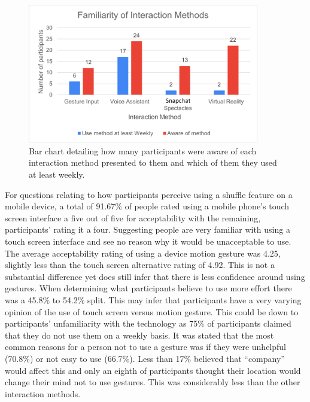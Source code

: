 \documentclass{l4proj}
\begin{document}
\begin{figure}[h!]
    \centering
    \includegraphics[width=0.9\textwidth]{images/familiarity.png}
        \caption{Bar chart detailing how many participants were aware of each interaction method presented to them and which of them they used at least weekly.}
        \label{fig:familiar}
\end{figure}

For questions relating to how participants perceive using a shuffle feature on a mobile device, a total of 91.67\% of people rated using a mobile phone's touch screen interface a five out of five for acceptability with the remaining, participants' rating it a four. Suggesting people are very familiar with using a touch screen interface and see no reason why it would be unacceptable to use. The average acceptability rating of using a device motion gesture was 4.25, slightly less than the touch screen alternative rating of 4.92. This is not a substantial difference yet does still infer that there is less confidence around using gestures. When determining what participants believe to use more effort there was a 45.8\% to 54.2\% split. This may infer that participants have a very varying opinion of the use of touch screen versus motion gesture. This could be down to participants’ unfamiliarity with the technology as 75\% of participants claimed that they do not use them on a weekly basis. It was stated that the most common reasons for a person not to use a gesture was if they were unhelpful (70.8\%) or not easy to use (66.7\%). Less than 17\% believed that ``company'' would affect this and only an eighth of participants thought their location would change their mind not to use gestures. This was considerably less than the other interaction methods.
\end{document}
